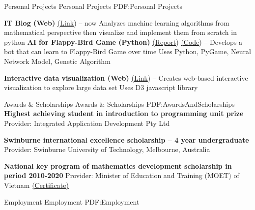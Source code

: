 \documentclass[letterpaper,MMMyyyy,nonstopmode]{simpleresumecv}
\begin{document}
\begin{Body}
\Section
{Personal Projects}
{Personal Projects}
{PDF:Personal Projects}

\BulletItem
\textbf{IT Blog (Web)} \href{https://dunglai.github.io}{(\color{blue}Link})
\hfill
{} --
now
\SubBulletItem Analyzes machine learning algorithms from mathematical perspective then visualize and implement them from scratch in python
\Gap\Gap\Gap
\BulletItem
\textbf{AI for Flappy-Bird Game (Python)} \href{https://dunglai.github.io/public/post-assets/FlappyBirdAI/report.pdf}{(\color{blue}Report}) \href{https://github.com/DungLai/AI-FlappyBird}{(\color{blue}Code})
\hfill
{} --
\SubBulletItem Develops a bot that can learn to Flappy-Bird Game over time
\SubBulletItem Uses Python, PyGame, Neural Network Model, Genetic Algorithm

\BulletItem
\textbf{Interactive data visualization (Web)} \href{https://dunglai.github.io/SwinWork/cars-visual/index.html}{(\color{blue}Link})
\hfill
{} --
\SubBulletItem Creates web-based interactive visualization to explore large data set \SubBulletItem Uses D3 javascript library




\Section
{Awards \&\newline
Scholarships}
{Awards \& Scholarships}
{PDF:AwardsAndScholarships}
\BulletItem
\textbf{Highest achieving student in introduction to programming unit prize}
\hfill
{}
\SubBulletItem Provider: Integrated Application Development Pty Ltd

\Gap\Gap\Gap

\BulletItem
\textbf{Swinburne international excellence scholarship – 4 year undergraduate}
\hfill
{}
\SubBulletItem Provider: Swinburne University of Technology, Melbourne, Australia

\Gap\Gap\Gap
\BulletItem
\textbf{National key program of mathematics development scholarship in period 2010-2020}
\hfill
{}
\SubBulletItem Provider: Minister of Education and Training (MOET) of Vietnam \href{https://dunglai.github.io/public/post-assets/About/CVLatex/MathCert.png}{(\color{blue}Certificate)}

\Section 
{Employment}
{Employment}
{PDF:Employment}


\end{Body}
\end{document}
